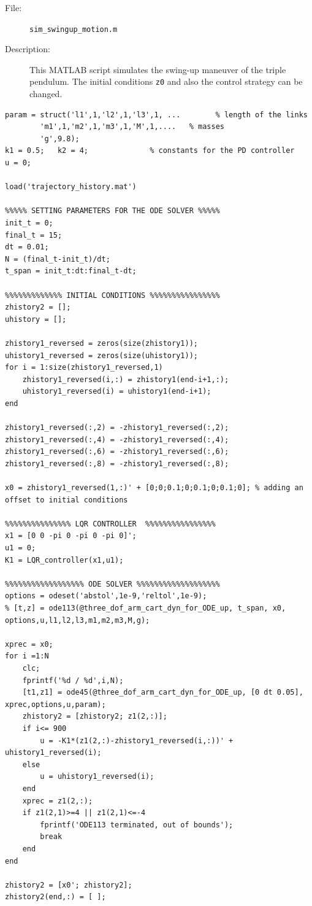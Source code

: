 \documentclass[a4paper,12pt]{article}
\begin{document}
\begin{description}
	\item[File:] \texttt{sim\_swingup\_motion.m}
	\item[Description:] This MATLAB script simulates the swing-up maneuver of the triple pendulum. The initial conditions \texttt{z0} and also the control strategy can be changed.
\end{description}
\begin{lstlisting}[label=code:simswingup,caption=\texttt{sim\_swingup\_motion.m}]
%%%%%%%%% DEFINITIONS OF THE PARAMETERS %%%%%%%%%
param = struct('l1',1,'l2',1,'l3',1, ...        % length of the links
        'm1',1,'m2',1,'m3',1,'M',1,....   % masses
        'g',9.8);
k1 = 0.5;   k2 = 4;              % constants for the PD controller
u = 0;

load('trajectory_history.mat')

%%%%% SETTING PARAMETERS FOR THE ODE SOLVER %%%%%
init_t = 0;
final_t = 15;
dt = 0.01;
N = (final_t-init_t)/dt;
t_span = init_t:dt:final_t-dt;

%%%%%%%%%%%%% INITIAL CONDITIONS %%%%%%%%%%%%%%%%
zhistory2 = [];
uhistory = [];

zhistory1_reversed = zeros(size(zhistory1));
uhistory1_reversed = zeros(size(uhistory1));
for i = 1:size(zhistory1_reversed,1)
    zhistory1_reversed(i,:) = zhistory1(end-i+1,:);
    uhistory1_reversed(i) = uhistory1(end-i+1);
end

zhistory1_reversed(:,2) = -zhistory1_reversed(:,2);
zhistory1_reversed(:,4) = -zhistory1_reversed(:,4);
zhistory1_reversed(:,6) = -zhistory1_reversed(:,6);
zhistory1_reversed(:,8) = -zhistory1_reversed(:,8);

x0 = zhistory1_reversed(1,:)' + [0;0;0.1;0;0.1;0;0.1;0]; % adding an offset to initial conditions

%%%%%%%%%%%%%%% LQR CONTROLLER  %%%%%%%%%%%%%%%%
x1 = [0 0 -pi 0 -pi 0 -pi 0]';
u1 = 0;
K1 = LQR_controller(x1,u1);

%%%%%%%%%%%%%%%%%% ODE SOLVER %%%%%%%%%%%%%%%%%%%
options = odeset('abstol',1e-9,'reltol',1e-9);
% [t,z] = ode113(@three_dof_arm_cart_dyn_for_ODE_up, t_span, x0, options,u,l1,l2,l3,m1,m2,m3,M,g);

xprec = x0;
for i =1:N
    clc;
    fprintf('%d / %d',i,N);
    [t1,z1] = ode45(@three_dof_arm_cart_dyn_for_ODE_up, [0 dt 0.05], xprec,options,u,param);
    zhistory2 = [zhistory2; z1(2,:)];
    if i<= 900
        u = -K1*(z1(2,:)-zhistory1_reversed(i,:))' + uhistory1_reversed(i);
    else
        u = uhistory1_reversed(i);
    end
    xprec = z1(2,:);
    if z1(2,1)>=4 || z1(2,1)<=-4
        fprintf('ODE113 terminated, out of bounds');
        break
    end
end

zhistory2 = [x0'; zhistory2];
zhistory2(end,:) = [ ];
\end{lstlisting}


\newpage
{}
\nocite{*}


\end{document}
